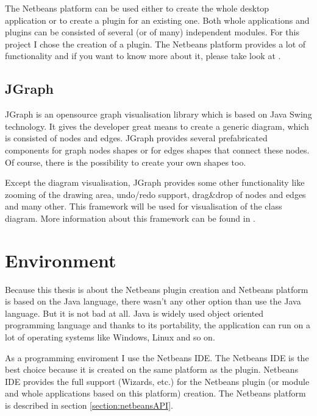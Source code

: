 The Netbeans platform can be used either to create the whole desktop application or to create a plugin for an existing one. Both whole applications and plugins can be consisted of several (or of many) independent modules. For this project I chose the creation of a plugin. The Netbeans platform provides a lot of functionality and if you want to know more about it, please take look at \cite{netbeans6.9DevGuide}.

\subsection{JGraph}
\label{section:JGraph}

JGraph is an opensource graph visualisation library which is based on Java Swing technology. It gives the developer great means to create a generic diagram, which is consisted of nodes and edges. JGraph provides several prefabricated components for graph nodes shapes or for edges shapes that connect these nodes. Of course, there is the possibility to create your own shapes too.

Except the diagram visualisation, JGraph provides some other functionality like zooming of the drawing area, undo/redo support, drag\&drop of nodes and edges and many other. This framework will be used for visualisation of the class diagram. More information about this framework can be found in \cite{jgraphmanual}.

\section{Environment}

Because this thesis is about the Netbeans plugin creation and Netbeans platform is based on the Java language, there wasn't any other option than use the Java language. But it is not bad at all. Java is widely used object oriented programming language and thanks to its portability, the application can run on a lot of operating systems like Windows, Linux and so on.

As a programming enviroment I use the Netbeans IDE. The Netbeans IDE is the best choice because it is created on the same platform as the plugin. Netbeans IDE provides the full support (Wizards, etc.) for the Netbeans plugin (or module and whole applications based on this platform) creation. The Netbeans platform is described in section \ref{section:netbeansAPI}.
